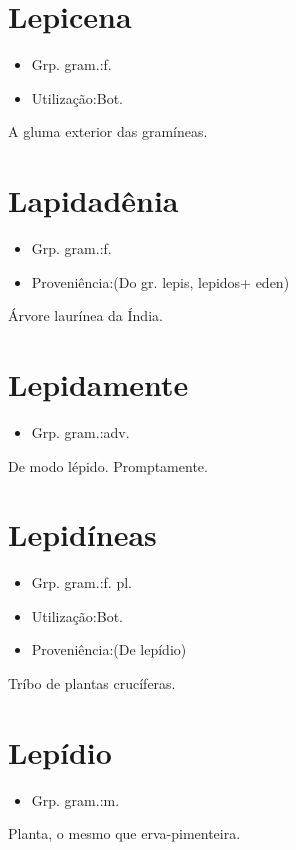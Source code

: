 \section{Lepicena}
\begin{itemize}
\item {Grp. gram.:f.}
\end{itemize}
\begin{itemize}
\item {Utilização:Bot.}
\end{itemize}
A gluma exterior das gramíneas.
\section{Lapidadênia}
\begin{itemize}
\item {Grp. gram.:f.}
\end{itemize}
\begin{itemize}
\item {Proveniência:(Do gr. \textunderscore lepis\textunderscore , \textunderscore lepidos\textunderscore  + \textunderscore eden\textunderscore )}
\end{itemize}
Árvore laurínea da Índia.
\section{Lepidamente}
\begin{itemize}
\item {Grp. gram.:adv.}
\end{itemize}
De modo lépido.
Promptamente.
\section{Lepidíneas}
\begin{itemize}
\item {Grp. gram.:f. pl.}
\end{itemize}
\begin{itemize}
\item {Utilização:Bot.}
\end{itemize}
\begin{itemize}
\item {Proveniência:(De \textunderscore lepídio\textunderscore )}
\end{itemize}
Tríbo de plantas crucíferas.
\section{Lepídio}
\begin{itemize}
\item {Grp. gram.:m.}
\end{itemize}
Planta, o mesmo que \textunderscore erva-pimenteira\textunderscore .

